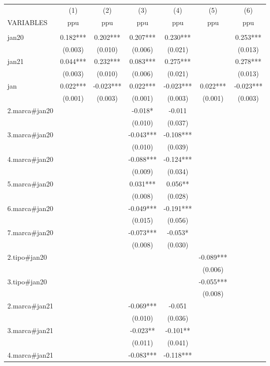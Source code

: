 \begin{tabular}{lcccccc} \hline
 & (1) & (2) & (3) & (4) & (5) & (6) \\
VARIABLES & ppu & ppu & ppu & ppu & ppu & ppu \\ \hline
 &  &  &  &  &  &  \\
jan20 & 0.182*** & 0.202*** & 0.207*** & 0.230*** &  & 0.253*** \\
 & (0.003) & (0.010) & (0.006) & (0.021) &  & (0.013) \\
jan21 & 0.044*** & 0.232*** & 0.083*** & 0.275*** &  & 0.278*** \\
 & (0.003) & (0.010) & (0.006) & (0.021) &  & (0.013) \\
jan & 0.022*** & -0.023*** & 0.022*** & -0.023*** & 0.022*** & -0.023*** \\
 & (0.001) & (0.003) & (0.001) & (0.003) & (0.001) & (0.003) \\
2.marca\#jan20 &  &  & -0.018* & -0.011 &  &  \\
 &  &  & (0.010) & (0.037) &  &  \\
3.marca\#jan20 &  &  & -0.043*** & -0.108*** &  &  \\
 &  &  & (0.010) & (0.039) &  &  \\
4.marca\#jan20 &  &  & -0.088*** & -0.124*** &  &  \\
 &  &  & (0.009) & (0.034) &  &  \\
5.marca\#jan20 &  &  & 0.031*** & 0.056** &  &  \\
 &  &  & (0.008) & (0.028) &  &  \\
6.marca\#jan20 &  &  & -0.049*** & -0.191*** &  &  \\
 &  &  & (0.015) & (0.056) &  &  \\
7.marca\#jan20 &  &  & -0.073*** & -0.053* &  &  \\
 &  &  & (0.008) & (0.030) &  &  \\
2.tipo\#jan20 &  &  &  &  & -0.089*** &  \\
&  &  &  &  & (0.006) &  \\
3.tipo\#jan20 &  &  &  &  & -0.055*** &  \\
&  &  &  &  & (0.008) &  \\
2.marca\#jan21 &  &  & -0.069*** & -0.051 &  &  \\
 &  &  & (0.010) & (0.036) &  &  \\
3.marca\#jan21 &  &  & -0.023** & -0.101** &  &  \\
 &  &  & (0.011) & (0.041) &  &  \\
4.marca\#jan21 &  &  & -0.083*** & -0.118*** &  &  \\

\end{tabular}
